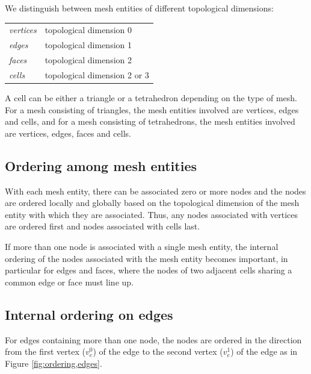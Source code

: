 We distinguish between mesh entities of different topological
dimensions:

\begin{center}
  \begin{tabular}{l|l}
    \emph{vertices} & topological dimension 0 \\
    \emph{edges}    & topological dimension 1 \\
    \emph{faces}    & topological dimension 2 \\
    \emph{cells}    & topological dimension 2 or 3
  \end{tabular}
\end{center}

A cell can be either a triangle or a tetrahedron depending on
the type of mesh. For a mesh consisting of triangles, the mesh
entities involved are vertices, edges and cells, and for a mesh
consisting of tetrahedrons, the mesh entities involved are vertices,
edges, faces and cells.

\subsection{Ordering among mesh entities}

With each mesh entity, there can be associated zero or more nodes and
the nodes are ordered locally and globally based on the topological
dimension of the mesh entity with which they are associated. Thus,
any nodes associated with vertices are ordered first and nodes
associated with cells last.

If more than one node is associated with a single mesh entity, the
internal ordering of the nodes associated with the mesh entity becomes
important, in particular for edges and faces, where the nodes of two
adjacent cells sharing a common edge or face must line up.

\subsection{Internal ordering on edges}

For edges containing more than one node, the nodes are ordered in the
direction from the first vertex ($v_e^0$) of the edge to the second
vertex ($v_e^1$) of the edge as in Figure \ref{fig:ordering,edges}.

